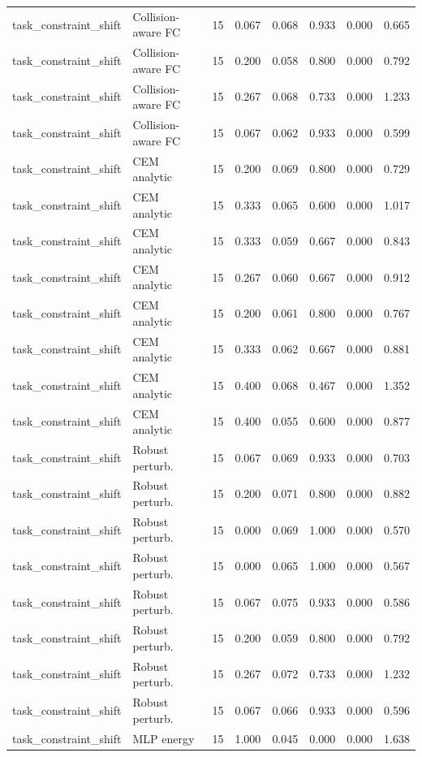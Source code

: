 {\begin{longtable}{llrrrrrr}
task\_constraint\_shift & Collision-aware FC & 15 & 0.067 & 0.068 & 0.933 & 0.000 & 0.665 \\
task\_constraint\_shift & Collision-aware FC & 15 & 0.200 & 0.058 & 0.800 & 0.000 & 0.792 \\
task\_constraint\_shift & Collision-aware FC & 15 & 0.267 & 0.068 & 0.733 & 0.000 & 1.233 \\
task\_constraint\_shift & Collision-aware FC & 15 & 0.067 & 0.062 & 0.933 & 0.000 & 0.599 \\
task\_constraint\_shift & CEM analytic & 15 & 0.200 & 0.069 & 0.800 & 0.000 & 0.729 \\
task\_constraint\_shift & CEM analytic & 15 & 0.333 & 0.065 & 0.600 & 0.000 & 1.017 \\
task\_constraint\_shift & CEM analytic & 15 & 0.333 & 0.059 & 0.667 & 0.000 & 0.843 \\
task\_constraint\_shift & CEM analytic & 15 & 0.267 & 0.060 & 0.667 & 0.000 & 0.912 \\
task\_constraint\_shift & CEM analytic & 15 & 0.200 & 0.061 & 0.800 & 0.000 & 0.767 \\
task\_constraint\_shift & CEM analytic & 15 & 0.333 & 0.062 & 0.667 & 0.000 & 0.881 \\
task\_constraint\_shift & CEM analytic & 15 & 0.400 & 0.068 & 0.467 & 0.000 & 1.352 \\
task\_constraint\_shift & CEM analytic & 15 & 0.400 & 0.055 & 0.600 & 0.000 & 0.877 \\
task\_constraint\_shift & Robust perturb. & 15 & 0.067 & 0.069 & 0.933 & 0.000 & 0.703 \\
task\_constraint\_shift & Robust perturb. & 15 & 0.200 & 0.071 & 0.800 & 0.000 & 0.882 \\
task\_constraint\_shift & Robust perturb. & 15 & 0.000 & 0.069 & 1.000 & 0.000 & 0.570 \\
task\_constraint\_shift & Robust perturb. & 15 & 0.000 & 0.065 & 1.000 & 0.000 & 0.567 \\
task\_constraint\_shift & Robust perturb. & 15 & 0.067 & 0.075 & 0.933 & 0.000 & 0.586 \\
task\_constraint\_shift & Robust perturb. & 15 & 0.200 & 0.059 & 0.800 & 0.000 & 0.792 \\
task\_constraint\_shift & Robust perturb. & 15 & 0.267 & 0.072 & 0.733 & 0.000 & 1.232 \\
task\_constraint\_shift & Robust perturb. & 15 & 0.067 & 0.066 & 0.933 & 0.000 & 0.596 \\
task\_constraint\_shift & MLP energy & 15 & 1.000 & 0.045 & 0.000 & 0.000 & 1.638 \\

\end{longtable}}
